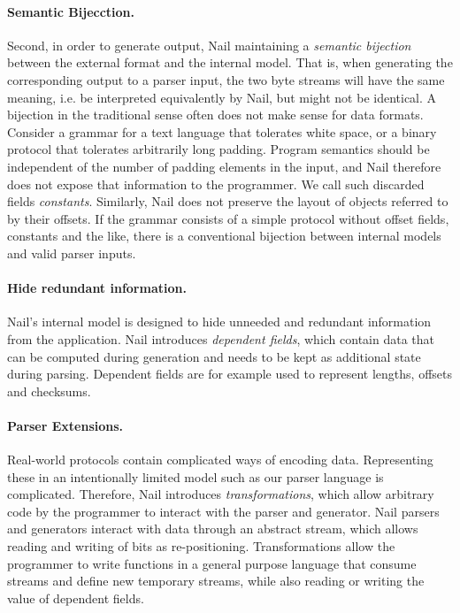 \noindent

\paragraph{Semantic Bijecction.}
Second, in order to generate output, Nail maintaining
a \emph{semantic bijection} between the external format and the internal model. That is, when
generating the corresponding output to a parser input, the two byte streams will have the same
meaning, i.e. be interpreted equivalently by Nail, but might not be identical.
 A bijection in the traditional sense often does not make sense for data
formats. Consider a grammar for a text language that tolerates white space, or a binary protocol
that tolerates arbitrarily long padding.
 Program semantics should be independent of the number of padding elements in the input, and Nail therefore
does not expose that information to the programmer. We call such discarded fields \emph{constants}.
Similarly, Nail does not preserve the layout of objects referred to by their offsets. If the grammar
consists of a simple protocol without offset fields, constants and the like, there is a conventional
bijection between  internal models and valid parser inputs.
\paragraph{Hide redundant information.}
Nail's internal model is designed to hide unneeded and redundant information from the application.
Nail introduces \emph{dependent fields}, which contain data that can be computed during generation
and needs to be kept as additional state during parsing. Dependent fields are for example used to represent
lengths, offsets and checksums.

\paragraph{Parser Extensions.}
Real-world protocols contain complicated ways of encoding data. Representing these in an
intentionally limited model such as our parser language is complicated. Therefore, Nail introduces
\emph{transformations}, which allow arbitrary code by the programmer to interact with the parser and
generator. Nail parsers and generators interact with data through an abstract stream, which allows
reading and writing of bits as re-positioning. Transformations allow the programmer to write
functions in a general purpose language that consume streams and define new temporary streams, while
also reading or writing the value of dependent fields.

